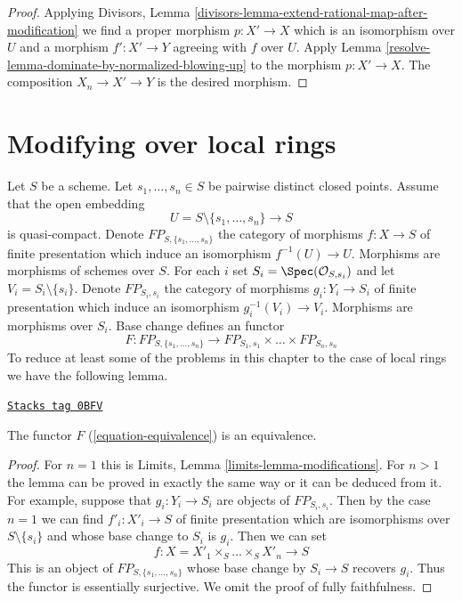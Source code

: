 \begin{proof}

Applying
Divisors, Lemma \ref{divisors-lemma-extend-rational-map-after-modification}
we find a proper morphism $p : X' \to X$ which is an isomorphism
over $U$ and a morphism $f' : X' \to Y$ agreeing with $f$ over $U$.
Apply Lemma \ref{resolve-lemma-dominate-by-normalized-blowing-up}
to the morphism $p : X' \to X$. The composition $X_n \to X' \to Y$ is
the desired morphism.
\end{proof}

\section{Modifying over local rings}
\label{resolve-section-modifications}
Let $S$ be a scheme. Let $s_1, \ldots, s_n \in S$ be pairwise distinct
closed points. Assume that the open embedding
$$
U = S \setminus \{s_1, \ldots, s_n\} \longrightarrow S
$$
is quasi-compact. Denote $FP_{S, \{s_1, \ldots, s_n\}}$
the category of morphisms $f : X \to S$ of finite presentation
which induce an isomorphism $f^{-1}(U) \to U$.
Morphisms are morphisms of schemes over $S$.
For each $i$ set $S_i = \Spec(\mathcal{O}_{S, s_i})$
and let $V_i = S_i \setminus \{s_i\}$. Denote
$FP_{S_i, s_i}$ the category of
morphisms $g_i : Y_i \to S_i$ of finite presentation which induce an
isomorphism $g_i^{-1}(V_i) \to V_i$.
Morphisms are morphisms over $S_i$.
Base change defines an functor
\begin{equation}
\label{equation-equivalence}
F :
FP_{S, \{s_1, \ldots, s_n\}}
\longrightarrow
FP_{S_1, s_1} \times \ldots \times FP_{S_n, s_n}
\end{equation}
To reduce at least some of the problems in this chapter to the case
of local rings we have the following lemma.

\begin{lemma}[Equivalence]
\label{resolve-lemma-equivalence}
\href{https://stacks.math.columbia.edu/tag/0BFV}{\texttt{Stacks tag 0BFV}}

The functor $F$ (\ref{equation-equivalence}) is an equivalence.
\end{lemma}

\begin{proof}
For $n = 1$ this is Limits, Lemma \ref{limits-lemma-modifications}.
For $n > 1$ the lemma can be proved in exactly the same way or it
can be deduced from it. For example, suppose that
$g_i : Y_i \to S_i$ are objects of $FP_{S_i, s_i}$.
Then by the case $n = 1$ we can find $f'_i : X'_i \to S$
of finite presentation
which are isomorphisms over $S \setminus \{s_i\}$ and whose
base change to $S_i$ is $g_i$. Then we can set
$$
f : X = X'_1 \times_S \ldots \times_S X'_n \to S
$$
This is an object of $FP_{S, \{s_1, \ldots, s_n\}}$
whose base change by $S_i \to S$ recovers $g_i$. Thus the functor
is essentially surjective. We omit the proof of
fully faithfulness.
\end{proof}

